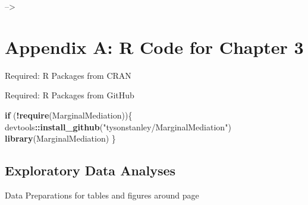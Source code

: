 \documentclass[]{article}
\title{}
\author{}
\date{}
\newenvironment{Shaded}{\begin{snugshade}}{\end{snugshade}}
\newcommand{\KeywordTok}[1]{\textcolor[rgb]{0.13,0.29,0.53}{\textbf{#1}}}
\newcommand{\StringTok}[1]{\textcolor[rgb]{0.31,0.60,0.02}{#1}}
\newcommand{\ControlFlowTok}[1]{\textcolor[rgb]{0.13,0.29,0.53}{\textbf{#1}}}
\newcommand{\OperatorTok}[1]{\textcolor[rgb]{0.81,0.36,0.00}{\textbf{#1}}}
\newcommand{\NormalTok}[1]{#1}
\begin{document}
--\textgreater{}

\doublespacing

\section*{Appendix A: R Code for Chapter
3}\label{appendix-a-r-code-for-chapter-3}

\singlespace

Required: R Packages from CRAN

\small

\normalsize

Required: R Packages from GitHub

\small

\begin{Shaded}
\begin{Highlighting}[]
\ControlFlowTok{if}\NormalTok{ (}\OperatorTok{!}\KeywordTok{require}\NormalTok{(MarginalMediation))\{}
\NormalTok{  devtools}\OperatorTok{::}\KeywordTok{install_github}\NormalTok{(}\StringTok{"tysonstanley/MarginalMediation"}\NormalTok{)}
  \KeywordTok{library}\NormalTok{(MarginalMediation)}
\NormalTok{\}}
\end{Highlighting}
\end{Shaded}

\normalsize

\clearpage

\subsection*{Exploratory Data Analyses}\label{exploratory-data-analyses}

Data Preparations for tables and figures around page

\small
\end{document}
